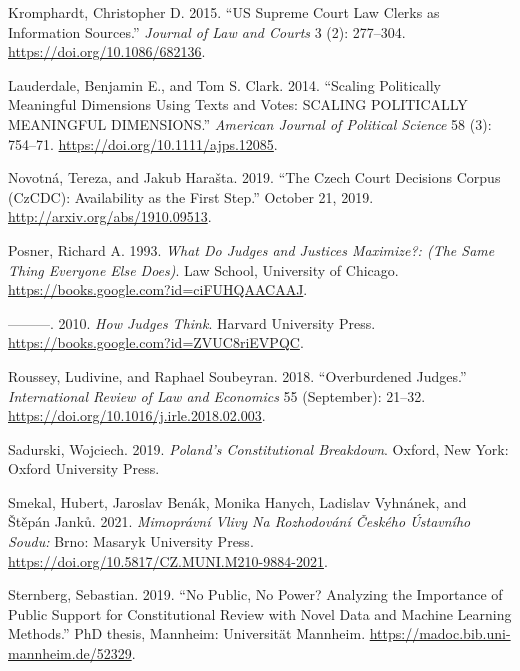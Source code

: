 \documentclass[
  11pt,
]{article}
\newlength{\cslhangindent}
\newenvironment{CSLReferences}[2] %
 {%
  \setlength{\parindent}{0pt}
  \ifodd #1 \everypar{\setlength{\hangindent}{\cslhangindent}}\ignorespaces\fi
  \ifnum #2 > 0
  \setlength{\parskip}{#2\baselineskip}
  \fi
 }%
 {}
\begin{document}
\begin{CSLReferences}{1}{0}
\leavevmode{}%
Kromphardt, Christopher D. 2015. {``{US Supreme Court Law Clerks} as
{Information Sources}.''} \emph{Journal of Law and Courts} 3 (2):
277--304. \url{https://doi.org/10.1086/682136}.

\leavevmode{}%
Lauderdale, Benjamin E., and Tom S. Clark. 2014. {``Scaling {Politically
Meaningful Dimensions Using Texts} and {Votes}: {SCALING POLITICALLY
MEANINGFUL DIMENSIONS}.''} \emph{American Journal of Political Science}
58 (3): 754--71. \url{https://doi.org/10.1111/ajps.12085}.

\leavevmode{}%
Novotná, Tereza, and Jakub Harašta. 2019. {``The {Czech Court Decisions
Corpus} ({CzCDC}): {Availability} as the {First Step}.''} October 21,
2019. \url{http://arxiv.org/abs/1910.09513}.

\leavevmode{}%
Posner, Richard A. 1993. \emph{What {Do Judges} and {Justices
Maximize}?: (The {Same Thing Everyone Else Does})}. {Law School,
University of Chicago}. \url{https://books.google.com?id=ciFUHQAACAAJ}.

\leavevmode{}%
---------. 2010. \emph{How {Judges Think}}. {Harvard University Press}.
\url{https://books.google.com?id=ZVUC8riEVPQC}.

\leavevmode{}%
Roussey, Ludivine, and Raphael Soubeyran. 2018. {``Overburdened
Judges.''} \emph{International Review of Law and Economics} 55
(September): 21--32. \url{https://doi.org/10.1016/j.irle.2018.02.003}.

\leavevmode{}%
Sadurski, Wojciech. 2019. \emph{Poland's {Constitutional Breakdown}}.
{Oxford, New York}: {Oxford University Press}.

\leavevmode{}%
Smekal, Hubert, Jaroslav Benák, Monika Hanych, Ladislav Vyhnánek, and
Štěpán Janků. 2021. \emph{Mimoprávní Vlivy Na Rozhodování Českého
{Ústavního} Soudu:} {Brno}: {Masaryk University Press}.
\url{https://doi.org/10.5817/CZ.MUNI.M210-9884-2021}.

\leavevmode{}%
Sternberg, Sebastian. 2019. {``No Public, No Power? {Analyzing} the
Importance of Public Support for Constitutional Review with Novel Data
and Machine Learning Methods.''} PhD thesis, {Mannheim}: {Universität
Mannheim}. \url{https://madoc.bib.uni-mannheim.de/52329}.


\end{CSLReferences}
\end{document}
